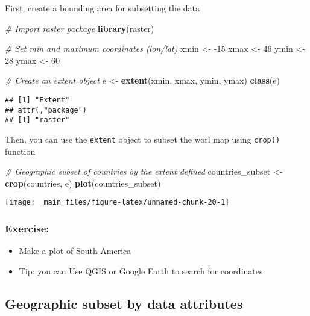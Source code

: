 \documentclass[]{book}
\newenvironment{Shaded}{\begin{snugshade}}{\end{snugshade}}
\newcommand{\CommentTok}[1]{\textcolor[rgb]{0.56,0.35,0.01}{\textit{#1}}}
\newcommand{\DecValTok}[1]{\textcolor[rgb]{0.00,0.00,0.81}{#1}}
\newcommand{\KeywordTok}[1]{\textcolor[rgb]{0.13,0.29,0.53}{\textbf{#1}}}
\newcommand{\NormalTok}[1]{#1}
\newcommand{\StringTok}[1]{\textcolor[rgb]{0.31,0.60,0.02}{#1}}
\providecommand{\tightlist}{%
  \setlength{\itemsep}{0pt}\setlength{\parskip}{0pt}}
\begin{document}
First, create a bounding area for subsetting the data

\begin{Shaded}
\begin{Highlighting}[]
\CommentTok{# Import raster package}
\KeywordTok{library}\NormalTok{(raster)}

\CommentTok{# Set min and maximum coordinates (lon/lat)}
\NormalTok{xmin <-}\StringTok{ }\DecValTok{-15}
\NormalTok{xmax <-}\StringTok{ }\DecValTok{46}
\NormalTok{ymin <-}\StringTok{ }\DecValTok{28}
\NormalTok{ymax <-}\StringTok{ }\DecValTok{60}

\CommentTok{# Create an extent object}
\NormalTok{e <-}\StringTok{ }\KeywordTok{extent}\NormalTok{(xmin, xmax, ymin, ymax)}
\KeywordTok{class}\NormalTok{(e)}
\end{Highlighting}
\end{Shaded}

\begin{verbatim}
## [1] "Extent"
## attr(,"package")
## [1] "raster"
\end{verbatim}

Then, you can use the \texttt{extent} object to subset the worl map using \texttt{crop()} function

\begin{Shaded}
\begin{Highlighting}[]
\CommentTok{# Geographic subset of countries by the extent defined}
\NormalTok{countries_subset <-}\StringTok{ }\KeywordTok{crop}\NormalTok{(countries, e)}
\KeywordTok{plot}\NormalTok{(countries_subset)}
\end{Highlighting}
\end{Shaded}

\begin{center}\texttt{[image: \_main\_files/figure-latex/unnamed-chunk-20-1]} \end{center}

\hypertarget{exercise}{%
\subsubsection{Exercise:}\label{exercise}}

\begin{itemize}
\tightlist
\item
  Make a plot of South America
\item
  Tip: you can Use QGIS or Google Earth to search for coordinates
\end{itemize}

\hypertarget{geographic-subset-by-data-attributes}{%
\subsection{Geographic subset by data attributes}\label{geographic-subset-by-data-attributes}}
\end{document}
